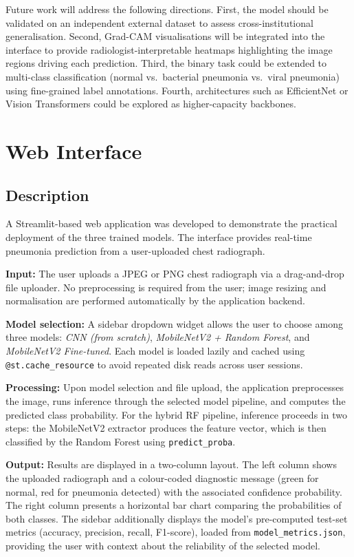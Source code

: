 \documentclass[conference]{IEEEtran}
\begin{document}
Future work will address the following directions.
First, the model should be validated on an independent
external dataset to assess cross-institutional
generalisation. Second, Grad-CAM \cite{selvaraju2017}
visualisations will be integrated into the interface to
provide radiologist-interpretable heatmaps highlighting
the image regions driving each prediction. Third, the
binary task could be extended to multi-class classification
(normal vs.\ bacterial pneumonia vs.\ viral pneumonia)
using fine-grained label annotations. Fourth, architectures
such as EfficientNet \cite{tan2019} or Vision Transformers
could be explored as higher-capacity backbones.

\section{Web Interface}
\label{sec:demo}

\subsection{Description}

A Streamlit-based \cite{streamlit} web application was
developed to demonstrate the practical deployment of the
three trained models. The interface provides real-time
pneumonia prediction from a user-uploaded chest radiograph.

\textbf{Input:} The user uploads a JPEG or PNG chest
radiograph via a drag-and-drop file uploader. No
preprocessing is required from the user; image resizing
and normalisation are performed automatically by the
application backend.

\textbf{Model selection:} A sidebar dropdown widget allows
the user to choose among three models:
\emph{CNN (from scratch)},
\emph{MobileNetV2 + Random Forest}, and
\emph{MobileNetV2 Fine-tuned}. Each model is loaded
lazily and cached using \texttt{@st.cache\_resource} to
avoid repeated disk reads across user sessions.

\textbf{Processing:} Upon model selection and file upload,
the application preprocesses the image, runs inference
through the selected model pipeline, and computes the
predicted class probability. For the hybrid RF pipeline,
inference proceeds in two steps: the MobileNetV2 extractor
produces the feature vector, which is then classified by
the Random Forest using \texttt{predict\_proba}.

\textbf{Output:} Results are displayed in a two-column
layout. The left column shows the uploaded radiograph and
a colour-coded diagnostic message (green for normal, red
for pneumonia detected) with the associated confidence
probability. The right column presents a horizontal bar
chart comparing the probabilities of both classes.
The sidebar additionally displays the model's
pre-computed test-set metrics (accuracy, precision,
recall, F1-score), loaded from \texttt{model\_metrics.json},
providing the user with context about the reliability of
the selected model.
\end{document}
